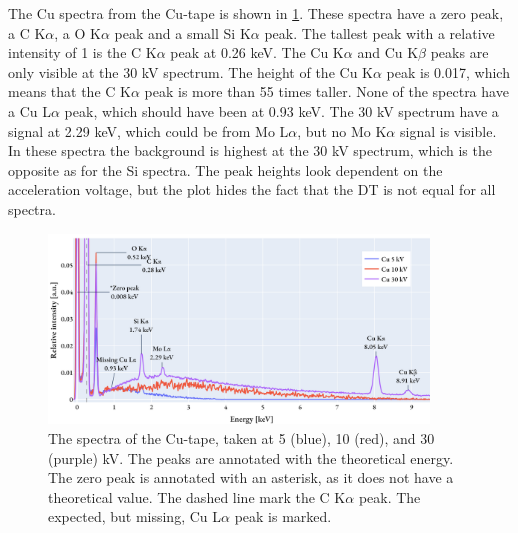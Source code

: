 The Cu spectra from the Cu-tape is shown in \cref{fig:results:Spectra_Cu}.
These spectra have a zero peak, a C K$\alpha$, a O K$\alpha$ peak and a small Si K$\alpha$ peak.
The tallest peak with a relative intensity of 1 is the C K$\alpha$ peak at 0.26 keV.
The Cu K$\alpha$ and Cu K$\beta$ peaks are only visible at the 30 kV spectrum.
The height of the Cu K$\alpha$ peak is 0.017, which means that the C K$\alpha$ peak is more than 55 times taller.
None of the spectra have a Cu L$\alpha$ peak, which should have been at 0.93 keV.
The 30 kV spectrum have a signal at 2.29 keV, which could be from Mo L$\alpha$, but no Mo K$\alpha$ signal is visible.
In these spectra the background is highest at the 30 kV spectrum, which is the opposite as for the Si spectra.
The peak heights look dependent on the acceleration voltage, but the plot hides the fact that the DT is not equal for all spectra.


\begin{figure}[h]
    \centering
    \includegraphics[width=0.90\textwidth]{figures/each_spectra/Cu_everything.png}
    \caption{
        The spectra of the Cu-tape, taken at 5 (blue), 10 (red), and 30 (purple) kV.
        The peaks are annotated with the theoretical energy.
        The zero peak is annotated with an asterisk, as it does not have a theoretical value.
        The dashed line mark the C K$\alpha$ peak.
        The expected, but missing, Cu L$\alpha$ peak is marked.
    }
    \label{fig:results:Spectra_Cu}
\end{figure}

